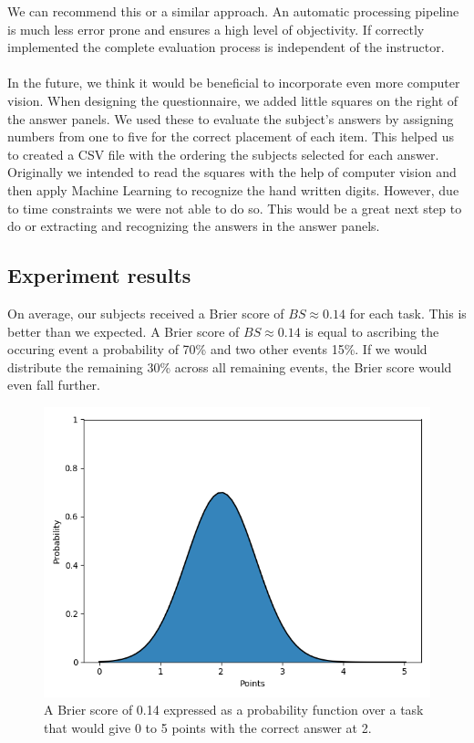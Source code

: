 \documentclass[../main/main.tex]{subfiles}
\begin{document}
	We can recommend this or a similar approach. An automatic processing pipeline is much less error prone and ensures a high level of objectivity. If correctly implemented the complete evaluation process is independent of the instructor. 
	\\\\
	In the future, we think it would be beneficial to incorporate even more computer vision. When designing the questionnaire, we added little squares on the right of the answer panels. We used these to evaluate the subject's answers by assigning numbers from one to five for the correct placement of each item. This helped us to created a CSV file with the ordering the subjects selected for each answer. Originally we intended to read the squares with the help of computer vision and then apply Machine Learning to recognize the hand written digits. However, due to time constraints we were not able to do so. This would be a great next step to do or extracting and recognizing the answers in the answer panels.
	
	\subsection{Experiment results}
	\label{sec:exp_results}
	
	On average, our subjects received a Brier score of $BS \approx 0.14$ for each task. This is better than we expected. A Brier score of $BS \approx 0.14$ is equal to ascribing the occuring event a probability of 70\% and two other events 15\%. If we would distribute the remaining 30\% across all remaining events, the Brier score would even fall further. 
	
	\begin{figure}[h]
		\centering
		\includegraphics[width=.5\textwidth]{../assets/brier_plot.png}
		\caption{A Brier score of 0.14 expressed as a probability function over a task that would give 0 to 5 points with the correct answer at 2.}
	\end{figure}
	
\end{document}
